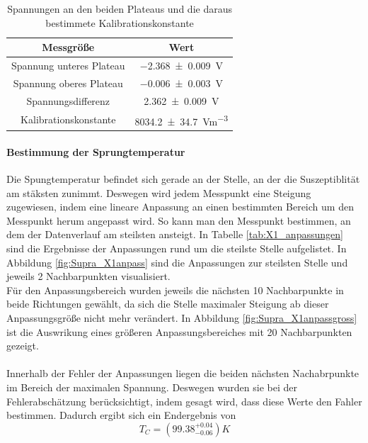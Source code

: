 \documentclass[12pt,a4paper]{article}
\begin{document}
\begin{table}
\centering
\begin{tabular}{|c|c|}
\hline 
Messgröße & Wert \\ 
\hline 
Spannung unteres Plateau & \SI{-2.368\pm 0.009}{V} \\ 
\hline 
Spannung oberes Plateau & \SI{-0.006\pm 0.003}{V} \\ 
\hline 
Spannungsdifferenz & \SI{2.362\pm 0.009}{V} \\ 
\hline 
Kalibrationskonstante & \SI{8034.2\pm 34.7}{Vm^{-3}} \\ 
\hline 
\end{tabular} 
\caption{Spannungen an den beiden Plateaus und die daraus bestimmete Kalibrationskonstante}
\label{tab:X1_const}
\end{table}

\paragraph{Bestimmung der Sprungtemperatur}
Die Spungtemperatur befindet sich gerade an der Stelle, an der die Suszeptiblität am stäksten zunimmt. Deswegen wird jedem Messpunkt eine Steigung zugewiesen, indem eine lineare Anpassung an einen bestimmten Bereich um den Messpunkt herum angepasst wird. So kann man den Messpunkt bestimmen, an dem der Datenverlauf am steilsten ansteigt. In Tabelle \ref{tab:X1_anpassungen} sind die Ergebnisse der Anpassungen rund um die steilste Stelle aufgelistet. In Abbildung
\ref{fig:Supra_X1anpass} sind die Anpassungen zur steilsten Stelle und jeweils 2 Nachbarpunkten visualisiert.\\
Für den Anpassungsbereich wurden jeweils die nächsten 10 Nachbarpunkte in beide Richtungen gewählt, da sich die Stelle maximaler Steigung ab dieser Anpassungsgröße nicht mehr verändert. In Abbildung \ref{fig:Supra_X1anpassgross} ist die Auswrikung eines größeren Anpassungsbereiches mit 20 Nachbarpunkten gezeigt.\\
\\
Innerhalb der Fehler der Anpassungen liegen die beiden nächsten Nachabrpunkte im Bereich der maximalen Spannung. Deswegen wurden sie bei der Fehlerabschätzung berücksichtigt, indem gesagt wird, dass diese Werte den Fahler bestimmen. Dadurch ergibt sich ein Endergebnis von
\begin{equation*}
T_C = (99.38^{+0.04}_{-0.06}) K
\end{equation*}
\end{document}
